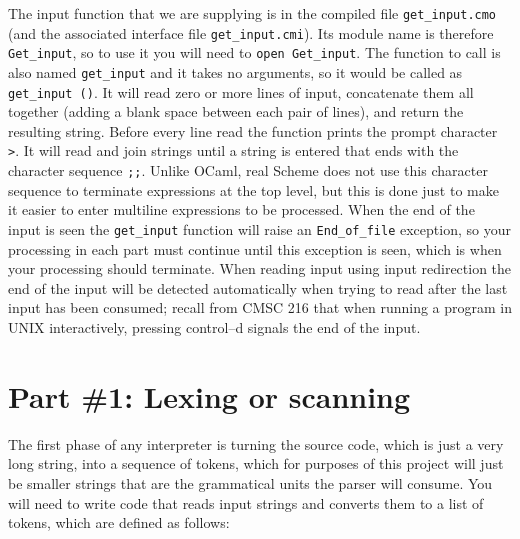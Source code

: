 \documentclass[11pt]{article}
\begin{document}
    \vspace{-2.5mm}

    The input function that we are supplying is in the compiled file
  \texttt{get\_input.cmo} (and the associated interface file
  \texttt{get\_input.cmi}).  Its module name is therefore
  \texttt{Get\_input}, so to use it you will need to \texttt{open
  Get\_input}.  The function to call is also named \texttt{get\_input} and
  it takes no arguments, so it would be called as \texttt{get\_input ()}.
  It will read zero or more lines of input, concatenate them all together
  (adding a blank space between each pair of lines), and return the
  resulting string.  Before every line read the function prints the prompt
  character \texttt{>}.  It will read and join strings until a string is
  entered that ends with the character sequence \texttt{;;}.  Unlike OCaml,
  real Scheme does not use this character sequence to terminate expressions
  at the top level, but this is done just to make it easier to enter
  multiline expressions to be processed.  When the end of the input is seen
  the \texttt{get\_input} function will raise an \texttt{End\_of\_file}
  exception, so your processing in each part must continue until this
  exception is seen, which is when your processing should terminate.  When
  reading input using input redirection the end of the input will be
  detected automatically when trying to read after the last input has been
  consumed; recall from CMSC 216 that when running a program in UNIX
  interactively, pressing control--d signals the end of the input.

  \section{Part \#1: Lexing or scanning\label{section:scanning}}

    The first phase of any interpreter is turning the source code, which is
  just a very long string, into a sequence of tokens, which for purposes of
  this project will just be smaller strings that are the grammatical units
  the parser will consume.  You will need to write code that reads input
  strings and converts them to a list of tokens, which are defined as
  follows:

    \vspace{-2.5mm}
\end{document}
